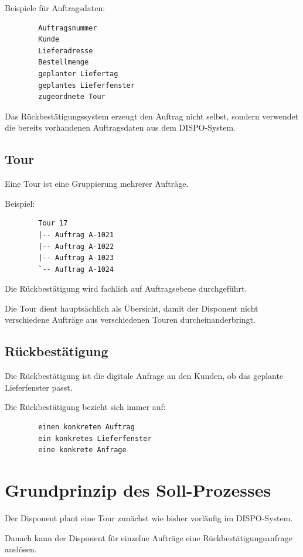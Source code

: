 \documentclass[12pt,a4paper]{article}
\begin{document}
	Beispiele für Auftragsdaten:
	
	\begin{lstlisting}
		Auftragsnummer
		Kunde
		Lieferadresse
		Bestellmenge
		geplanter Liefertag
		geplantes Lieferfenster
		zugeordnete Tour
	\end{lstlisting}
	
	Das Rückbestätigungssystem erzeugt den Auftrag nicht selbst, sondern verwendet die bereits vorhandenen Auftragsdaten aus dem DISPO-System.
	
	\subsection{Tour}
	
	Eine Tour ist eine Gruppierung mehrerer Aufträge.
	
	Beispiel:
	
	\begin{lstlisting}
		Tour 17
		|-- Auftrag A-1021
		|-- Auftrag A-1022
		|-- Auftrag A-1023
		`-- Auftrag A-1024
	\end{lstlisting}
	
	Die Rückbestätigung wird fachlich auf Auftragsebene durchgeführt.
	
	Die Tour dient hauptsächlich als Übersicht, damit der Disponent nicht verschiedene Aufträge aus verschiedenen Touren durcheinanderbringt.
	
	\subsection{Rückbestätigung}
	
	Die Rückbestätigung ist die digitale Anfrage an den Kunden, ob das geplante Lieferfenster passt.
	
	Die Rückbestätigung bezieht sich immer auf:
	
	\begin{lstlisting}
		einen konkreten Auftrag
		ein konkretes Lieferfenster
		eine konkrete Anfrage
	\end{lstlisting}
	
	\section{Grundprinzip des Soll-Prozesses}
	
	Der Disponent plant eine Tour zunächst wie bisher vorläufig im DISPO-System.
	
	Danach kann der Disponent für einzelne Aufträge eine Rückbestätigungsanfrage auslösen.
	
\end{document}
